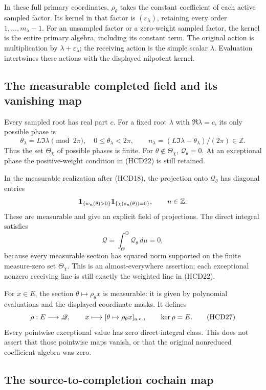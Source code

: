 In these full primary coordinates, $\rho_\theta$ takes
the constant coefficient of each active sampled factor.
Its kernel in that factor is $(\varepsilon_\lambda)$,
retaining every order $1,\ldots,m_\lambda-1$.
For an unsampled factor or a zero-weight sampled factor,
the kernel is the entire primary algebra, including
its constant term. The original action is multiplication
by $\lambda+\varepsilon_\lambda$; the receiving action
is the simple scalar $\lambda$. Evaluation intertwines
these actions with the displayed nilpotent kernel.

\subsection{The measurable completed field and its vanishing map}

Every sampled root has real part $c$. For a fixed root $\lambda$
with $\Re\lambda=c$, its only possible phase is
\[
 \theta_\lambda=L\Im\lambda\pmod{2\pi},\quad
 0\le\theta_\lambda<2\pi,\qquad
 n_\lambda=(L\Im\lambda-\theta_\lambda)/(2\pi)\in\mathbb Z.
\]
Thus the set $\Theta_\chi$ of possible phases is finite.
For $\theta\notin\Theta_\chi$, $\mathcal Q_\theta=0$.
At an exceptional phase the positive-weight condition
in (HCD22) is still retained.

In the measurable realization after (HCD18), the projection
onto $\mathcal Q_\theta$ has diagonal entries
\[
 {\bf1}_{\{w_n(\theta)>0\}}
 {\bf1}_{\{\chi(s_n(\theta))=0\}},\qquad n\in\mathbb Z.
\]
These are measurable and give an explicit field of projections.
The direct integral satisfies
\[
 \mathscr Q=\int_\Theta^\oplus\mathcal Q_\theta\,d\mu=0,
 \tag{HCD26}
\]
because every measurable section has squared norm supported
on the finite measure-zero set $\Theta_\chi$.
This is an almost-everywhere assertion; each exceptional
nonzero receiving line is still exactly the weighted line
in (HCD22).

For $x\in E$, the section $\theta\mapsto\rho_\theta x$
is measurable: it is given by polynomial evaluations and
the displayed coordinate masks. It defines
\[
 \rho:E\longrightarrow\mathscr Q,\qquad
 x\longmapsto[\theta\mapsto\rho_\theta x]_{\rm a.e.},
 \qquad \ker\rho=E.
 \tag{HCD27}
\]
Every pointwise exceptional value has zero direct-integral
class. This does not assert that those pointwise maps vanish,
or that the original nonreduced coefficient algebra was zero.

\subsection{The source-to-completion cochain map}

